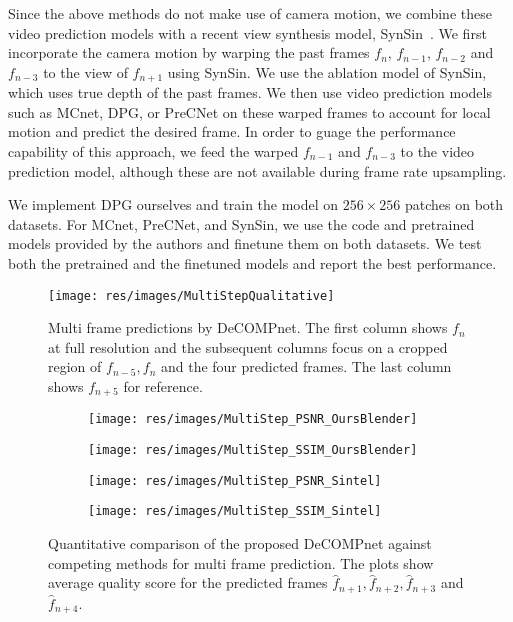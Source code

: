 \documentclass[preprint]{vgtc}
\begin{document}
    Since the above methods do not make use of camera motion, we combine these video prediction models with a recent view synthesis model, SynSin~\cite{wiles2020synsin}.
    We first incorporate the camera motion by warping the past frames $f_{n}$, $f_{n-1}$, $f_{n-2}$ and $f_{n-3}$ to the view of $f_{n+1}$ using SynSin.
    We use the ablation model of SynSin, which uses true depth of the past frames.
    We then use video prediction models such as MCnet, DPG, or PreCNet on these warped frames to account for local motion and predict the desired frame.
    In order to guage the performance capability of this approach, we feed the warped $f_{n-1}$ and $f_{n-3}$ to the video prediction model, although these are not available during frame rate upsampling.

    We implement DPG ourselves and train the model on $256 \times 256$ patches on both datasets.
    For MCnet, PreCNet, and SynSin, we use the code and pretrained models provided by the authors and finetune them on both datasets.
    We test both the pretrained and the finetuned models and report the best performance.
    
    \begin{figure*}
        \centering
        \texttt{[image: res/images/MultiStepQualitative]}
        \caption{Multi frame predictions by DeCOMPnet.
        The first column shows $f_n$ at full resolution and the subsequent columns focus on a cropped region of $f_{n-5}, f_n$ and the four predicted frames.
        The last column shows $f_{n+5}$ for reference.
        }
        \label{fig:multistep-qualitative}
    \end{figure*}
    \begin{figure*}
        \centering
        \begin{subfigure}{.24\textwidth}
            \centering
            \texttt{[image: res/images/MultiStep\_PSNR\_OursBlender]}
        \end{subfigure}
        \begin{subfigure}{.24\textwidth}
            \centering
            \texttt{[image: res/images/MultiStep\_SSIM\_OursBlender]}
        \end{subfigure}
        \begin{subfigure}{.24\textwidth}
            \centering
            \texttt{[image: res/images/MultiStep\_PSNR\_Sintel]}
        \end{subfigure}
        \begin{subfigure}{.24\textwidth}
            \centering
            \texttt{[image: res/images/MultiStep\_SSIM\_Sintel]}
        \end{subfigure}
        \caption{Quantitative comparison of the proposed DeCOMPnet against competing methods for multi frame prediction.
The plots show average quality score for the predicted frames $\hat{f}_{n+1}, \hat{f}_{n+2}, \hat{f}_{n+3}$ and $\hat{f}_{n+4}$.
        }
        \label{fig:multistep-quantitative}
    \end{figure*}
\end{document}
